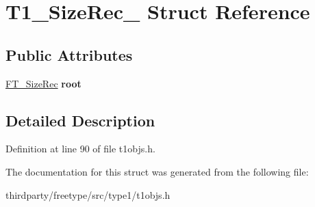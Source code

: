 \hypertarget{struct_t1___size_rec__}{}\section{T1\+\_\+\+Size\+Rec\+\_\+ Struct Reference}
\label{struct_t1___size_rec__}
\subsection*{Public Attributes}
\begin{DoxyCompactItemize}
\item 
\mbox{\label{struct_t1___size_rec___ae0aa203127356e95060d5e1706f5705c}} 
\hyperlink{struct_f_t___size_rec__}{F\+T\+\_\+\+Size\+Rec} {\bfseries root}
\end{DoxyCompactItemize}


\subsection{Detailed Description}


Definition at line 90 of file t1objs.\+h.



The documentation for this struct was generated from the following file\+:\begin{DoxyCompactItemize}
\item 
thirdparty/freetype/src/type1/t1objs.\+h\end{DoxyCompactItemize}
